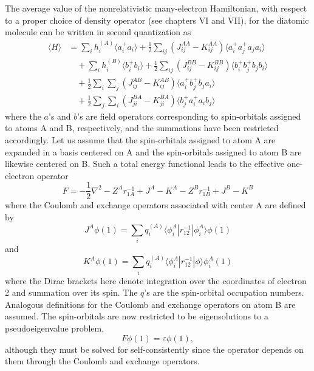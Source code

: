 \documentclass[12pt,letterpaper]{report}
\begin{document}
The average value of the nonrelativistic many-electron Hamiltonian, with respect to a proper choice of density operator (see chapters VI and VII), for the diatomic molecule can be written in second quantization as
\begin{align}
\langle H \rangle &= \sum_i h_i^{(A)} \langle a_i^+ a_i \rangle + \frac{1}{2} \sum_{ij} (J_{ij}^{AA} - K_{ij}^{AA}) \langle a_i^+ a_j^+ a_j a_i \rangle \nonumber\\
&\quad + \sum_i h_i^{(B)} \langle b_i^+ b_i \rangle + \frac{1}{2} \sum_{ij} (J_{ij}^{BB} - K_{ij}^{BB}) \langle b_i^+ b_j^+ b_j b_i \rangle \nonumber\\
&\quad + \frac{1}{2} \sum_i \sum_j (J_{ij}^{AB} - K_{ij}^{AB}) \langle a_i^+ b_j^+ b_j a_i \rangle \nonumber\\
&\quad + \frac{1}{2} \sum_j \sum_i (J_{ji}^{BA} - K_{ji}^{BA}) \langle b_j^+ a_i^+ a_i b_j \rangle
\end{align}
where the $a$'s and $b$'s are field operators corresponding to spin-orbitals assigned to atoms A and B, respectively, and the summations have been restricted accordingly. Let us assume that the spin-orbitals assigned to atom A are expanded in a basis centered on A and the spin-orbitals assigned to atom B are likewise centered on B. Such a total energy functional leads to the effective one-electron operator
\begin{equation}
F = -\frac{1}{2}\nabla^2 - Z^A r_{1A}^{-1} + J^A - K^A - Z^B r_{1B}^{-1} + J^B - K^B
\end{equation}
where the Coulomb and exchange operators associated with center A are defined by
\begin{equation}
J^A \phi(1) = \sum_i q_i^{(A)} \langle \phi_i^A | r_{12}^{-1} | \phi_i^A \rangle \phi(1)
\end{equation}
and
\begin{equation}
K^A \phi(1) = \sum_i q_i^{(A)} \langle \phi_i^A | r_{12}^{-1} | \phi \rangle \phi_i^A(1)
\end{equation}
where the Dirac brackets here denote integration over the coordinates of electron 2 and summation over its spin. The $q$'s are the spin-orbital occupation numbers. Analogous definitions for the Coulomb and exchange operators on atom B are assumed. The spin-orbitals are now restricted to be eigensolutions to a pseudoeigenvalue problem,
\begin{equation}
F \phi(1) = \varepsilon \phi(1),
\end{equation}
although they must be solved for self-consistently since the operator depends on them through the Coulomb and exchange operators.
\end{document}
